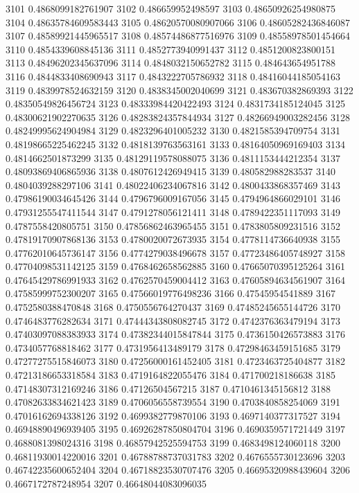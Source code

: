 3101 0.4868099182761907
3102 0.486659952498597
3103 0.48650926254980875
3104 0.48635784609583443
3105 0.48620570080907066
3106 0.48605282436846087
3107 0.48589921445965517
3108 0.48574486877516976
3109 0.48558978501454664
3110 0.4854339608845136
3111 0.4852773940991437
3112 0.4851200823800151
3113 0.48496202345637096
3114 0.4848032150652782
3115 0.484643654951788
3116 0.4844833408690943
3117 0.4843222705786932
3118 0.48416044185054163
3119 0.4839978524632159
3120 0.4838345002040699
3121 0.483670382869393
3122 0.48350549826456724
3123 0.48333984420422493
3124 0.4831734185124045
3125 0.48300621902270635
3126 0.48283824357844934
3127 0.48266949003282456
3128 0.48249995624904984
3129 0.4823296401005232
3130 0.4821585394709754
3131 0.48198665225462245
3132 0.4818139763563161
3133 0.48164050969169403
3134 0.4814662501873299
3135 0.48129119578088075
3136 0.4811153444212354
3137 0.48093869406865936
3138 0.4807612426949415
3139 0.480582988283537
3140 0.4804039288297106
3141 0.48022406234067816
3142 0.4800433868357469
3143 0.47986190034645426
3144 0.4796796009167056
3145 0.4794964866029101
3146 0.47931255547411544
3147 0.4791278056121411
3148 0.4789422351117093
3149 0.4787558420805751
3150 0.47856862463965455
3151 0.4783805809231516
3152 0.47819170907868136
3153 0.4780020072673935
3154 0.4778114736640938
3155 0.47762010645736147
3156 0.4774279038496678
3157 0.47723486405748927
3158 0.47704098531142125
3159 0.4768462658562885
3160 0.47665070395125264
3161 0.47645429786991933
3162 0.4762570459004412
3163 0.47605894634561907
3164 0.47585999752300207
3165 0.47566019776498236
3166 0.47545954541889
3167 0.4752580388470848
3168 0.4750556764270437
3169 0.47485245655144726
3170 0.4746483776282634
3171 0.47444343808082745
3172 0.4742376363479194
3173 0.47403097088383933
3174 0.47382344015847844
3175 0.4736150426573883
3176 0.4734057768818462
3177 0.4731956413489179
3178 0.47298463459151685
3179 0.47277275515846073
3180 0.47256000161452405
3181 0.4723463725404877
3182 0.47213186653318584
3183 0.4719164822055476
3184 0.471700218186638
3185 0.47148307312169246
3186 0.47126504567215
3187 0.4710461345156812
3188 0.47082633834621423
3189 0.4706056558739554
3190 0.4703840858254069
3191 0.47016162694338126
3192 0.4699382779870106
3193 0.4697140377317527
3194 0.46948890496939405
3195 0.46926287850804704
3196 0.4690359571721449
3197 0.4688081398024316
3198 0.46857942525594753
3199 0.4683498124060118
3200 0.46811930014220016
3201 0.46788788737031783
3202 0.4676555730123696
3203 0.46742235600652404
3204 0.46718823530707476
3205 0.46695320988439604
3206 0.4667172787248954
3207 0.46648044083096035
